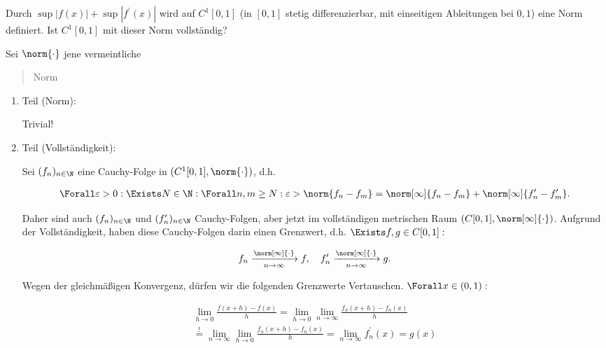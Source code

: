 
\begin{exercise}

Durch $\sup |f(x)| + \sup |f^\prime(x)|$ wird auf $C^1[0, 1]$ (in $[0, 1]$ stetig differenzierbar, mit einseitigen Ableitungen bei $0, 1$) eine Norm definiert.
Ist $C^1[0, 1]$ mit dieser Norm vollständig?

\end{exercise}


\begin{solution}

Sei $\norm{\cdot}$ jene vermeintliche \blockquote{Norm}.

\begin{enumerate}[label = \arabic*.]

    \item Teil (Norm):

    Trivial!

    \item Teil (Vollständigkeit):
    
    Sei $(f_n)_{n \in \N}$ eine Cauchy-Folge in $(C^1[0, 1], \norm{\cdot})$, d.h.

    \begin{align*}
        \Forall \varepsilon > 0:
        \Exists N \in \N:
        \Forall n, m \geq N:
        \varepsilon > \norm{f_n - f_m} = \norm[\infty]{f_n - f_m} + \norm[\infty]{f_n^\prime - f_m^\prime}.
    \end{align*}

    Daher sind auch $(f_n)_{n \in \N}$ und $(f_n^\prime)_{n \in \N}$ Cauchy-Folgen, aber jetzt im vollständigen metrischen Raum $(C[0, 1], \norm[\infty]{\cdot})$.
    Aufgrund der Vollständigkeit, haben diese Cauchy-Folgen darin einen Grenzwert, d.h. $\Exists f, g \in C[0, 1]:$

    \begin{align*}
        f_n \xrightarrow[n \to \infty]{\norm[\infty]{\cdot}} f,
        \quad
        f_n^\prime \xrightarrow[n \to \infty]{\norm[\infty]{\cdot}} g.
    \end{align*}

    Wegen der gleichmäßigen Konvergenz, dürfen wir die folgenden Grenzwerte Vertauschen.
    $\Forall x \in (0, 1):$

    \begin{multline*}
        \lim_{h \to 0}
        \frac{f(x + h) - f(x)}{h}
        =
        \lim_{h \to 0}
        \lim_{n \to \infty}
        \frac{f_n(x + h) - f_n(x)}{h} \\
        \stackrel{!}{=}
        \lim_{n \to \infty}
        \lim_{h \to 0}
        \frac{f_n(x + h) - f_n(x)}{h}
        =
        \lim_{n \to \infty}
        f_n^\prime(x)
        =
        g(x)
    \end{multline*}


\end{enumerate}
\end{solution}
